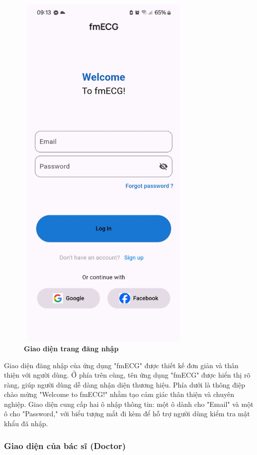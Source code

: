 \begin{figure}[H]
	\centering
	\includegraphics[width=8.5cm,height=18cm]{Images/AppUI/login.jpg}
	\caption[Giao diện trang đăng nhập]{\bfseries \fontsize{12pt}{0pt}\selectfont Giao diện trang đăng nhập}
	\label{login}
\end{figure}
Giao diện đăng nhập của ứng dụng "fmECG" được thiết kế đơn giản và thân thiện với người dùng. Ở phía trên cùng, tên ứng dụng "fmECG" được hiển thị rõ ràng, giúp người dùng dễ dàng nhận diện thương hiệu. Phía dưới là thông điệp chào mừng "Welcome to fmECG!" nhằm tạo cảm giác thân thiện và chuyên nghiệp. Giao diện cung cấp hai ô nhập thông tin: một ô dành cho "Email" và một ô cho "Password," với biểu tượng mắt đi kèm để hỗ trợ người dùng kiểm tra mật khẩu đã nhập.

\subsubsection{Giao diện của bác sĩ (Doctor)}

